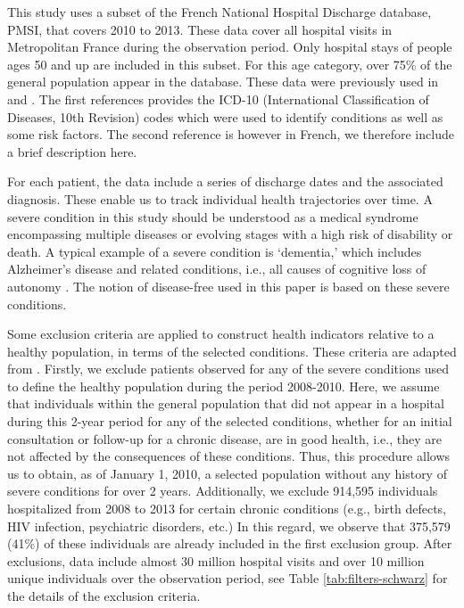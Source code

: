 \documentclass[risks,article,submit,moreauthors,pdftex]{Definitions/mdpi}
\begin{document}
This study uses a subset of the French National Hospital Discharge
database, PMSI, that covers 2010 to 2013. These data cover all hospital
visits in Metropolitan France during the observation period. Only
hospital stays of people ages 50 and up are included in this subset. For
this age category, over 75\% of the general population appear in the
database. These data were previously used in
\citet{schwarzinger_contribution_2018} and
\citet{schwarzinger_etude_2018}. The first references provides the
ICD-10 (International Classification of Diseases, 10th Revision) codes
which were used to identify conditions as well as some risk factors. The
second reference is however in French, we therefore include a brief
description here.

For each patient, the data include a series of discharge dates and the
associated diagnosis. These enable us to track individual health
trajectories over time. A severe condition in this study should be
understood as a medical syndrome encompassing multiple diseases or
evolving stages with a high risk of disability or death. A typical
example of a severe condition is `dementia,' which includes Alzheimer's
disease and related conditions, i.e., all causes of cognitive loss of
autonomy \citep{schwarzinger_etude_2018}. The notion of disease-free
used in this paper is based on these severe conditions.

Some exclusion criteria are applied to construct health indicators
relative to a healthy population, in terms of the selected conditions.
These criteria are adapted from \citet{schwarzinger_etude_2018}.
Firstly, we exclude patients observed for any of the severe conditions
used to define the healthy population during the period 2008-2010. Here,
we assume that individuals within the general population that did not
appear in a hospital during this 2-year period for any of the selected
conditions, whether for an initial consultation or follow-up for a
chronic disease, are in good health, i.e., they are not affected by the
consequences of these conditions. Thus, this procedure allows us to
obtain, as of January 1, 2010, a selected population without any history
of severe conditions for over 2 years. Additionally, we exclude 914,595
individuals hospitalized from 2008 to 2013 for certain chronic
conditions (e.g., birth defects, HIV infection, psychiatric disorders,
etc.) In this regard, we observe that 375,579 (41\%) of these
individuals are already included in the first exclusion group. After
exclusions, data include almost 30 million hospital visits and over 10
million unique individuals over the observation period, see Table
\ref{tab:filters-schwarz} for the details of the exclusion criteria.
\end{document}
